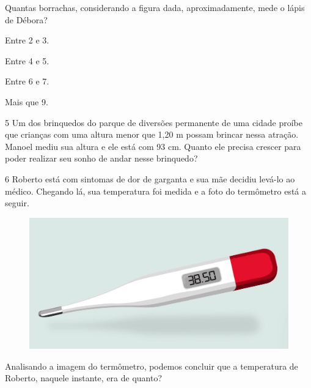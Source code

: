 Quantas borrachas, considerando a figura dada, aproximadamente, mede o
lápis de Débora?

\begin{escolha}
\item
  Entre 2 e 3.
\item
  Entre 4 e 5.
\item
  Entre 6 e 7.
\item
  Mais que 9.
\end{escolha}


\num{5} Um dos brinquedos do parque de diversões permanente de uma cidade
proíbe que crianças com uma altura menor que 1,20 m possam brincar nessa
atração. Manoel mediu sua altura e ele está com 93 cm. Quanto ele
precisa crescer para poder realizar seu sonho de andar nesse brinquedo?



\num{6} Roberto está com sintomas de dor de garganta e sua mãe decidiu levá-lo ao
médico. Chegando lá, sua temperatura foi medida e a foto do termômetro
está a seguir.

\begin{figure}[htpb!]
\includegraphics[width=.5\textwidth]{./imgs/mat4.png}
\end{figure}

Analisando a imagem do termômetro, podemos concluir que a temperatura de
Roberto, naquele instante, era de quanto?


